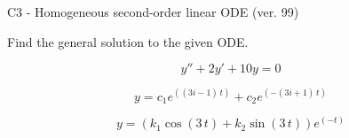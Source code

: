 \begin{exercise}
  \begin{exerciseTitle}C3 - Homogeneous second-order linear ODE (ver. 99)\end{exerciseTitle}
  \begin{exerciseStatement}
    
Find the general solution to the given ODE.

    
\[y''+2y'+10y = 0\]

  \end{exerciseStatement}
  \begin{exerciseAnswer}
    
\[y= c_{1} e^{\left(\left(3 i - 1\right) \, t\right)} + c_{2} e^{\left(-\left(3 i + 1\right) \, t\right)}\]

    
\[y= {\left(k_{1} \cos\left(3 \, t\right) + k_{2} \sin\left(3 \, t\right)\right)} e^{\left(-t\right)}\]

  \end{exerciseAnswer}
\end{exercise}